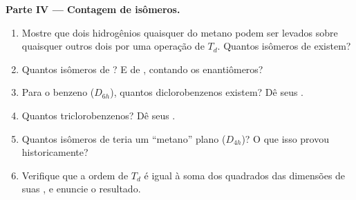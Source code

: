 \begin{problem}
\medskip\noindent\textbf{Parte IV --- Contagem de isômeros.}
\begin{enumerate}[resume]
  \item Mostre que dois hidrogênios quaisquer do metano podem ser levados sobre
        quaisquer outros dois por uma operação de $T_d$. Quantos isômeros de
         existem?
  \item Quantos isômeros de ? E de , contando os enantiômeros?
  \item Para o benzeno ($D_{6h}$), quantos diclorobenzenos existem? Dê seus
        .
  \item Quantos triclorobenzenos? Dê seus .
  \item Quantos isômeros de  teria um ``metano'' plano ($D_{4h}$)? O
        que isso provou historicamente?
  \item Verifique que a ordem de $T_d$ é igual à soma dos quadrados das
        dimensões de suas , e enuncie o resultado.
\end{enumerate}
\end{problem}
